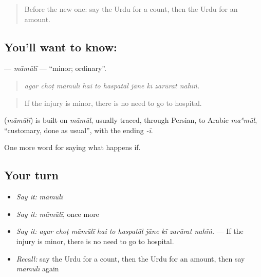 \label{lesson:UR-C376-mamuli}



\begin{quote}
Before the new one: say the Urdu for a count, then the Urdu for an amount.
\end{quote}

\subsection*{You'll want to know: }
\textbf{} — \emph{māmūlī} — \textquotedblleft{}minor; ordinary\textquotedblright{}.

\begin{quote}
         
\end{quote}

\begin{quote}
\emph{agar choṭ māmūlī hai to haspatāl jāne kī zarūrat nahīṅ.}
\end{quote}

\begin{quote}
If the injury is minor, there is no need to go to hospital.
\end{quote}

\begin{cousinweb}
\textbf{} (\emph{māmūlī}) is built on \emph{māmūl}, usually traced, through Persian, to Arabic \emph{maʿmūl}, \textquotedblleft{}customary, done as usual\textquotedblright{}, with the ending \emph{-ī}.
\end{cousinweb}

\begin{grammarlens}[title={What you've built}]
One more word for saying what happens if.
\end{grammarlens}

\subsection*{Your turn}
\begin{itemize}
\raggedright
  \item \emph{Say it:} \emph{māmūlī}
  \item \emph{Say it:} \emph{māmūlī}, once more
  \item \emph{Say it:} \emph{agar choṭ māmūlī hai to haspatāl jāne kī zarūrat nahīṅ.} — If the injury is minor, there is no need to go to hospital.
  \item \emph{Recall:} say the Urdu for a count, then the Urdu for an amount, then say \emph{māmūlī} again
\end{itemize}

